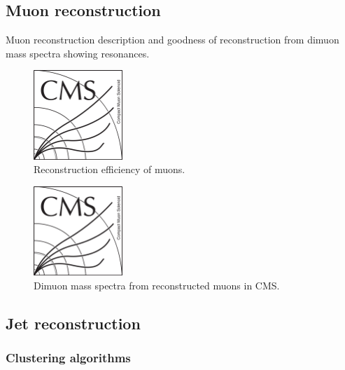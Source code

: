 \subsection{Muon reconstruction}

Muon reconstruction description and goodness of reconstruction from dimuon mass spectra showing resonances.

\begin{figure}[!Hhtbp]
  \begin{center}
    \includegraphics[width=0.3\textwidth]{figs/CMSlogo.png}
    \caption{Reconstruction efficiency of muons.}
    \label{fig:MuEff}
  \end{center}
\end{figure}

\begin{figure}[!Hhtbp]
  \begin{center}
    \includegraphics[width=0.3\textwidth]{figs/CMSlogo.png}
    \caption{Dimuon mass spectra from reconstructed muons in CMS.}
    \label{fig:DiMuonMass}
  \end{center}
\end{figure}

\subsection{Jet reconstruction}

\subsubsection{Clustering algorithms}

